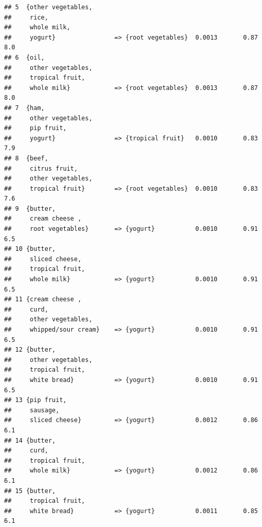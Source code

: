 \documentclass{article}\usepackage[]{graphicx}\usepackage[]{color}
\makeatletter
\newenvironment{kframe}{%
 \def\at@end@of@kframe{}%
 \ifinner\ifhmode%
  \def\at@end@of@kframe{\end{minipage}}%
  \begin{minipage}{\columnwidth}%
 \fi\fi%
 \def\FrameCommand##1{\hskip\@totalleftmargin \hskip-\fboxsep
 \colorbox{shadecolor}{##1}\hskip-\fboxsep
     \hskip-\linewidth \hskip-\@totalleftmargin \hskip\columnwidth}%
 \MakeFramed {\advance\hsize-\width
   \@totalleftmargin\z@ \linewidth\hsize
   \@setminipage}}%
 {\par\unskip\endMakeFramed%
 \at@end@of@kframe}
\newenvironment{knitrout}{}{} %
\makeatother
\begin{document}
\begin{knitrout}
\begin{kframe}
\begin{verbatim}
## 5  {other vegetables,                                                  
##     rice,                                                              
##     whole milk,                                                        
##     yogurt}                => {root vegetables}  0.0013       0.87  8.0
## 6  {oil,                                                               
##     other vegetables,                                                  
##     tropical fruit,                                                    
##     whole milk}            => {root vegetables}  0.0013       0.87  8.0
## 7  {ham,                                                               
##     other vegetables,                                                  
##     pip fruit,                                                         
##     yogurt}                => {tropical fruit}   0.0010       0.83  7.9
## 8  {beef,                                                              
##     citrus fruit,                                                      
##     other vegetables,                                                  
##     tropical fruit}        => {root vegetables}  0.0010       0.83  7.6
## 9  {butter,                                                            
##     cream cheese ,                                                     
##     root vegetables}       => {yogurt}           0.0010       0.91  6.5
## 10 {butter,                                                            
##     sliced cheese,                                                     
##     tropical fruit,                                                    
##     whole milk}            => {yogurt}           0.0010       0.91  6.5
## 11 {cream cheese ,                                                     
##     curd,                                                              
##     other vegetables,                                                  
##     whipped/sour cream}    => {yogurt}           0.0010       0.91  6.5
## 12 {butter,                                                            
##     other vegetables,                                                  
##     tropical fruit,                                                    
##     white bread}           => {yogurt}           0.0010       0.91  6.5
## 13 {pip fruit,                                                         
##     sausage,                                                           
##     sliced cheese}         => {yogurt}           0.0012       0.86  6.1
## 14 {butter,                                                            
##     curd,                                                              
##     tropical fruit,                                                    
##     whole milk}            => {yogurt}           0.0012       0.86  6.1
## 15 {butter,                                                            
##     tropical fruit,                                                    
##     white bread}           => {yogurt}           0.0011       0.85  6.1
\end{verbatim}
\end{kframe}
\end{knitrout}
\end{document}
